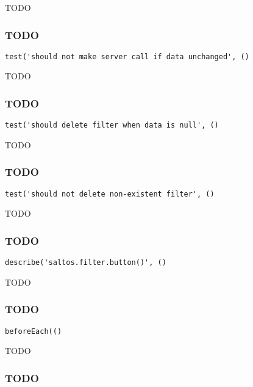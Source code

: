\documentclass[a4paper]{article}
\begin{document}
TODO

\hypertarget{toc600}{}
\subsubsection{TODO}

\begin{lstlisting}
test('should not make server call if data unchanged', ()
\end{lstlisting}

TODO

\hypertarget{toc601}{}
\subsubsection{TODO}

\begin{lstlisting}
test('should delete filter when data is null', ()
\end{lstlisting}

TODO

\hypertarget{toc602}{}
\subsubsection{TODO}

\begin{lstlisting}
test('should not delete non-existent filter', ()
\end{lstlisting}

TODO

\hypertarget{toc603}{}
\subsubsection{TODO}

\begin{lstlisting}
describe('saltos.filter.button()', ()
\end{lstlisting}

TODO

\hypertarget{toc604}{}
\subsubsection{TODO}

\begin{lstlisting}
beforeEach(()
\end{lstlisting}

TODO

\hypertarget{toc605}{}
\subsubsection{TODO}
\end{document}
